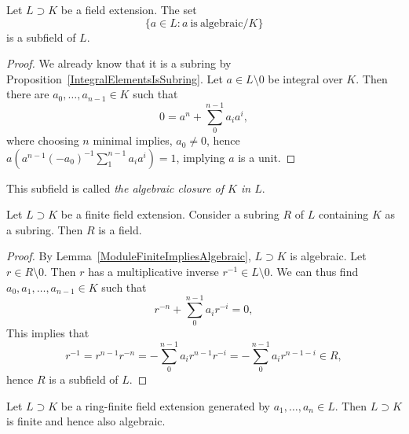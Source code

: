 \begin{proposition}
    Let $L\supset K$ be a field extension. The set 
    $$\{a\in L: a \ \mathrm{is}\ \mathrm{algebraic}/K\}$$
    is a subfield of $L$.
\end{proposition}
\begin{proof}
    We already know that it is a subring by Proposition~\ref{IntegralElementsIsSubring}. Let $a\in L\setminus 0$ be integral over $K$. Then there are $a_0,\dots,a_{n-1}\in K$ such that 
    $$0= a^n+\sum_0^{n-1} a_ia^{i},$$
    where choosing $n$ minimal implies, $a_0 \neq 0$, hence 
    $a\left(a^{n-1}(-a_0)^{-1}\sum_1^{n-1} a_ia^{i}\right) = 1$, implying $a$ is a unit. 
\end{proof}
\begin{remark}
    This subfield is called \emph{the algebraic closure of $K$ in $L$}. 
\end{remark}
\begin{proposition}\label{CannotSqueezeNonFieldBetweenFiniteFieldExtension}
    Let $L\supset K$ be a finite field extension. Consider a subring $R$ of $L$ containing $K$ as a subring. Then $R$ is a field. 
\end{proposition}
\begin{proof}
    By Lemma~\ref{ModuleFiniteImpliesAlgebraic}, $L\supset K$ is algebraic. Let $r\in R\setminus 0$. Then $r$ has a multiplicative inverse $r^{-1}\in L\setminus 0$. We can thus find $a_0,a_1,\dots, a_{n-1}\in K$ such that 
    $$r^{-n}+\sum_0^{n-1} a_ir^{-i} = 0,$$
    This implies that 
    $$r^{-1}=r^{n-1}r^{-n} = -\sum_0^{n-1}a_i r^{n-1}r^{-i} = -\sum_0^{n-1} a_ir^{n-1-i}\in R,$$
    hence $R$ is a subfield of $L$. 
\end{proof}
\begin{theorem}
    Let $L\supset K$ be a ring-finite field extension generated by $a_1,\dots,a_n\in L$. Then $L\supset K$ is finite and hence also algebraic.   
\end{theorem}
